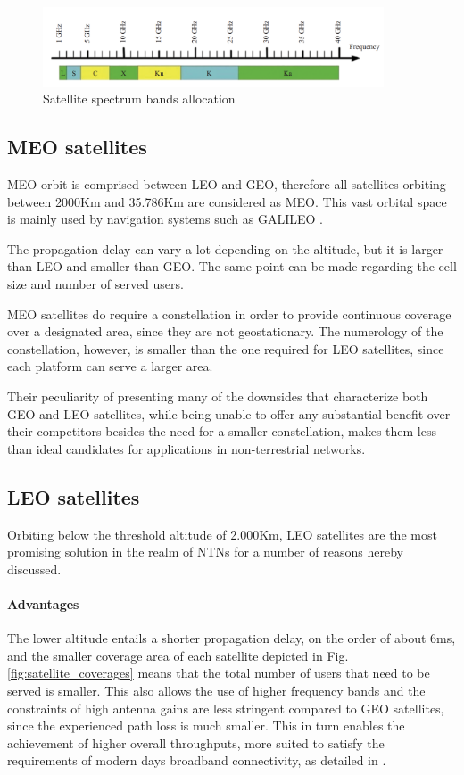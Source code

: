 \begin{figure}[ht]
    \centering
    \includegraphics[width=0.9\textwidth]{res/satellite-bands.png}
    \caption{Satellite spectrum bands allocation \cite{advances-comm-sat-sys}}
    \label{fig:satellite-bands}
\end{figure}

\subsection{MEO satellites}
\ac{MEO} orbit is comprised between \ac{LEO} and \ac{GEO}, therefore all satellites orbiting between 2000Km and 35.786Km are considered as \ac{MEO}. This vast orbital space is mainly used by navigation systems such as GALILEO \cite{types-of-orbits-esa}.

The propagation delay can vary a lot depending on the altitude, but it is larger than \ac{LEO} and smaller than \ac{GEO}. The same point can be made regarding the cell size and number of served users. 

\ac{MEO} satellites do require a constellation in order to provide continuous coverage over a designated area, since they are not geostationary. The numerology of the constellation, however, is smaller than the one required for \ac{LEO} satellites, since each platform can serve a larger area.

Their peculiarity of presenting many of the downsides that characterize both \ac{GEO} and \ac{LEO} satellites, while being unable to offer any substantial benefit over their competitors besides the need for a smaller constellation, makes them less than ideal candidates for applications in non-terrestrial networks.

\subsection{LEO satellites}
\label{sec:leo}
Orbiting below the threshold altitude of 2.000Km, \ac{LEO} satellites are the most promising solution in the realm of \ac{NTNs} for a number of reasons hereby discussed.

\paragraph{Advantages}
The lower altitude entails a shorter propagation delay, on the order of about 6ms, and the smaller coverage area of each satellite depicted in Fig. \ref{fig:satellite_coverages} means that the total number of users that need to be served is smaller. This also allows the use of higher frequency bands and the constraints of high antenna gains are less stringent compared to \ac{GEO} satellites, since the experienced path loss is much smaller. This in turn enables the achievement of higher overall throughputs, more suited to satisfy the requirements of modern days broadband connectivity, as detailed in \cite{satellite-communication-mmwave-giordani}.

